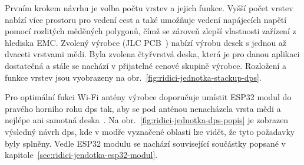         Prvním krokem návrhu je volba počtu vrstev a jejich funkce. Vyšší počet vrstev nabízí více prostoru pro vedení cest a také umožňuje vedení napájecích napětí pomocí rozlitých měděných polygonů, čímž se zároveň zlepší vlastnosti zařízení z hlediska \acs{EMC}. Zvolený výrobce (JLC PCB~\cite{jlcpcb}) nabízí výrobu desek s jednou až dvaceti vrstvami mědi. Byla zvolena čtyřvrstvá deska, která je pro danou aplikaci dostatečná a stále se nachází v přijatelné cenové skupině výrobce. Rozložení a funkce vrstev jsou vyobrazeny na obr.~\ref{fig:ridici-jednotka-stackup-dps}.

        Pro optimální fukci Wi-Fi antény výrobce doporučuje umístit ESP32 modul do pravého horního rohu \acs{dps} tak, aby se pod anténou nenacházela vrsta mědi a nejlépe ani samotná deska~\cite{esp32-hw-guidelines}. Na obr.~\ref{fig:ridici-jednotka-dps-popis} je zobrazen výsledný návrh \acs{dps}, kde v modře vyznačené oblasti lze vidět, že tyto požadavky byly splněny. Vedle ESP32 modulu se nachází související součástky popsané v kapitole~\ref{sec:ridici-jendotka-esp32-modul}.

